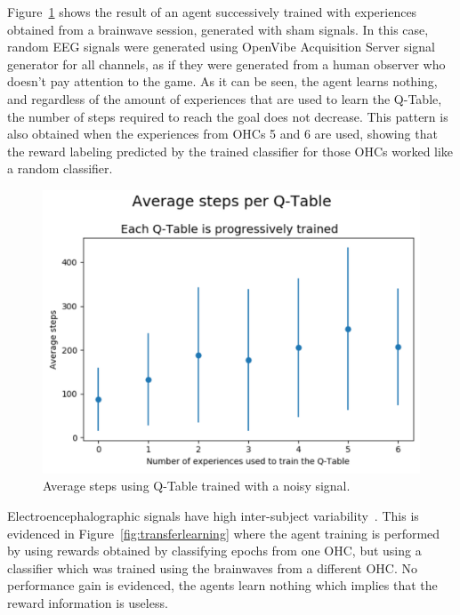 \documentclass[journal]{IEEEtran}
\begin{document}
{{%

Figure~\ref{fig:avg_steps_noise} shows the result of an agent successively trained with experiences obtained from a brainwave session, generated with sham signals.  In this case, random EEG signals were generated using OpenVibe Acquisition Server signal generator for all channels, as if they were generated from a human observer who doesn't pay attention to the game.  As it can be seen, the agent learns nothing, and regardless of the amount of experiences that are used to learn the Q-Table, the number of steps required to reach the goal does not decrease.  This pattern is also obtained when the experiences from OHCs 5 and 6 are used, showing that the reward labeling predicted by the trained classifier for those OHCs worked like a random classifier.

\begin{figure}[h!]
\centering
\includegraphics[scale=0.4]{Images/Average_steps/noise.png}
\caption{Average steps using Q-Table trained with a noisy signal.}
\label{fig:avg_steps_noise}
\end{figure}

Electroencephalographic signals have high inter-subject variability~\cite{Chavarriaga2014}.   This is evidenced in Figure~\ref{fig:transferlearning} where the agent training is performed by using rewards obtained by classifying epochs from one OHC, but using a classifier which was trained using the brainwaves from a different OHC.   No performance gain is evidenced, the agents learn nothing which implies that the reward information is useless.


}}
\end{document}
